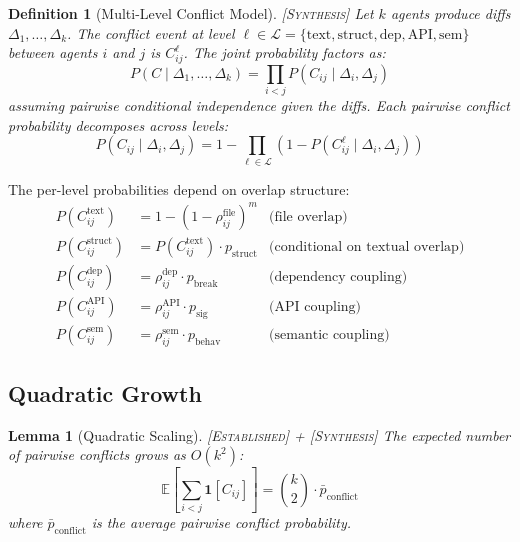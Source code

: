 \documentclass[11pt, a4paper, logo, copyright]{googledeepmind}
\newtheorem{definition}{Definition}[section]
\newtheorem{lemma}[theorem]{Lemma}
\newcommand{\established}{\textsc{[Established]}}
\newcommand{\synthesis}{\textsc{[Synthesis]}}
\begin{document}
\begin{definition}[Multi-Level Conflict Model] \synthesis{}
\label{def:conflict-pgm}
Let $k$ agents produce diffs $\Delta_1, \ldots, \Delta_k$.
The conflict event at level $\ell \in \mathcal{L} = \{\mathrm{text}, \mathrm{struct}, \mathrm{dep}, \mathrm{API}, \mathrm{sem}\}$ between agents $i$ and $j$ is $C_{ij}^\ell$.
The joint probability factors as:
\begin{equation}
  P(C \mid \Delta_1, \ldots, \Delta_k) = \prod_{i < j} P(C_{ij} \mid \Delta_i, \Delta_j)
\end{equation}
assuming pairwise conditional independence given the diffs.
Each pairwise conflict probability decomposes across levels:
\begin{equation}
  P(C_{ij} \mid \Delta_i, \Delta_j) = 1 - \prod_{\ell \in \mathcal{L}} \left(1 - P(C_{ij}^\ell \mid \Delta_i, \Delta_j)\right)
\end{equation}
\end{definition}

The per-level probabilities depend on overlap structure:
\begin{align}
  P(C_{ij}^{\mathrm{text}}) &= 1 - (1 - \rho_{ij}^{\mathrm{file}})^{m} & \text{(file overlap)} \\
  P(C_{ij}^{\mathrm{struct}}) &= P(C_{ij}^{\mathrm{text}}) \cdot p_{\mathrm{struct}} & \text{(conditional on textual overlap)} \\
  P(C_{ij}^{\mathrm{dep}}) &= \rho_{ij}^{\mathrm{dep}} \cdot p_{\mathrm{break}} & \text{(dependency coupling)} \\
  P(C_{ij}^{\mathrm{API}}) &= \rho_{ij}^{\mathrm{API}} \cdot p_{\mathrm{sig}} & \text{(API coupling)} \\
  P(C_{ij}^{\mathrm{sem}}) &= \rho_{ij}^{\mathrm{sem}} \cdot p_{\mathrm{behav}} & \text{(semantic coupling)}
\end{align}

\subsection{Quadratic Growth}

\begin{lemma}[Quadratic Scaling] \established{} + \synthesis{}
\label{lem:quadratic}
The expected number of pairwise conflicts grows as $O(k^2)$:
\begin{equation}
  \mathbb{E}\!\left[\sum_{i<j} \mathbf{1}[C_{ij}]\right] = \binom{k}{2} \cdot \bar{p}_{\mathrm{conflict}}
\end{equation}
where $\bar{p}_{\mathrm{conflict}}$ is the average pairwise conflict probability.
\end{lemma}
\end{document}
